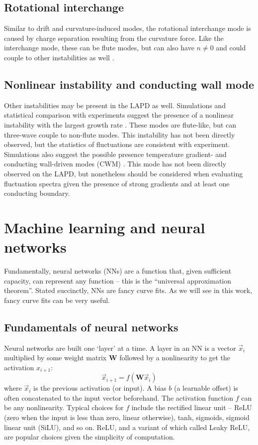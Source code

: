 \subsection{Rotational interchange}

Similar to drift and curvature-induced modes, the rotational interchange mode is caused by charge separation resulting from the curvature force. Like the interchange mode, these can be flute modes, but can also have $n\neq0$ and could couple to other instabilities as well \cite{Friedman_simulation_2013}.

\subsection{Nonlinear instability and conducting wall mode}

Other instabilities may be present in the LAPD as well. Simulations and statistical comparison with experiments suggest the presence of a nonlinear instability with the largest growth rate \cite{Friedman_2013}. These modes are flute-like, but can three-wave couple to non-flute modes. This instability has not been directly observed, but the statistics of fluctuations are consistent with experiment. Simulations also suggest the possible presence temperature gradient- and conducting wall-driven modes (CWM) \cite{Friedman_2013, Berk_1991}. This mode has not been directly observed on the LAPD, but nonetheless should be considered when evaluating fluctuation spectra given the presence of strong gradients and at least one conducting boundary.

\section{Machine learning and neural networks}

Fundamentally, neural networks (NNs) are a function that, given sufficient capacity, can represent any function -- this is the ``universal approximation theorem''. Stated succinctly, NNs are fancy curve fits. As we will see in this work, fancy curve fits can be very useful.

\subsection{Fundamentals of neural networks}

Neural networks are built one `layer' at a time. A layer in an NN is a vector $\vec x_i$ multiplied by some weight matrix $\mathbf{W}$ followed by a nonlinearity to get the activation $x_{i+1}$:
\begin{equation}
	\vec x_{i+1} = f( \mathbf{W} \vec x_i)
\end{equation}
where $\vec x_i$ is the previous activation (or input). A bias $b$ (a learnable offset) is often concatenated to the input vector beforehand. The activation function $f$ can be any nonlinearity. Typical choices for $f$ include the rectified  linear unit -- ReLU (zero when the input is less than zero, linear otherwise), tanh, sigmoids, sigmoid linear unit (SiLU), and so on. ReLU, and a variant of which called Leaky ReLU, are popular choices given the simplicity of computation.


